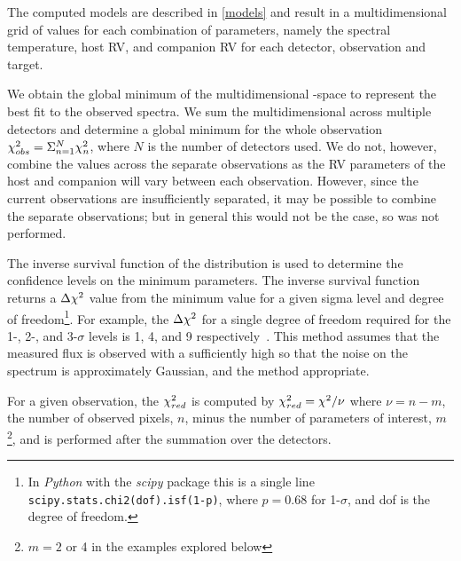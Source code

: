 The computed models are described in \cref{models} and result in a multidimensional grid of \textchisquared{} values for each combination of parameters, namely the spectral temperature, host {RV}, and companion {RV} for each detector, observation and target.

We obtain the global minimum of the multidimensional \textchisquared-space to represent the best fit to the observed spectra.
We sum the multidimensional \textchisquared{} across multiple detectors and determine a global minimum \textchisquared{} for the whole observation \({\chi}^{2}_{obs} = \Sigma^{N}_{n=1} {\chi}^{2}_n\), where \(N\) is the number of detectors used.
We do not, however, combine the \textchisquared{} values across the separate observations as the {RV} parameters of the host and companion will vary between each observation.
However, since the current observations are insufficiently separated, it may be possible to combine the separate observations; but in general this would not be the case, so was not performed.

The inverse survival function of the \textchisquared{} distribution is used to determine the confidence levels on the minimum \textchisquared{} parameters.
The inverse survival function returns a \(\Delta{\chi}^{2}\) value from the minimum \textchisquared{} value for a given sigma level and degree of freedom\footnote{In \emph{Python} with the \emph{scipy} package this is a single line \texttt{scipy.stats.chi2{(dof)}.isf{(1-p)}}, where \(p = 0.68\) for 1-\(\sigma\), and dof is the degree of freedom.}.
For example, the \(\Delta {\chi}^{2}\) for a single degree of freedom required for the 1-, 2-, and 3-\(\sigma\) levels is 1, 4, and 9 respectively~\citep{bevington_data_2003}.
This method assumes that the measured flux is observed with a \snr{} sufficiently high so that the noise on the spectrum is approximately Gaussian, and the \textchisquared{} method appropriate.

For a given observation, the \({\chi}^{2}_{red}\) is computed by \({\chi}^{2}_{red} = {\chi}^{2} / \nu\) where \(\nu = n - m\), the number of observed pixels, \(n\), minus the number of parameters of interest, \(m\)\footnote{\(m=2\) or 4 in the examples explored below}, and is performed after the summation over the detectors.




